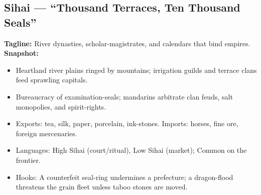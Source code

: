 \documentclass[11pt]{book}
\begin{document}
\subsection*{Sihai — “Thousand Terraces, Ten Thousand Seals”}
\textbf{Tagline:} River dynasties, scholar-magistrates, and calendars that bind empires.\\
\textbf{Snapshot:}
\begin{itemize}
  \item Heartland river plains ringed by mountains; irrigation guilds and terrace clans feed sprawling capitals.
  \item Bureaucracy of examination-seals; mandarins arbitrate clan feuds, salt monopolies, and spirit-rights.
  \item Exports: tea, silk, paper, porcelain, ink-stones. Imports: horses, fine ore, foreign mercenaries.
  \item Languages: High Sihai (court/ritual), Low Sihai (market); Common on the frontier.
  \item Hooks: A counterfeit seal-ring undermines a prefecture; a dragon-flood threatens the grain fleet unless taboo stones are moved.
\end{itemize}
\end{document}
